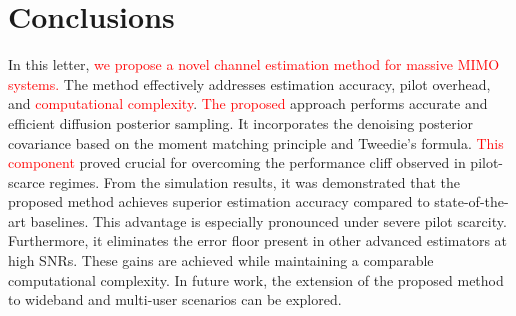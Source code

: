 \documentclass[lettersize,journal]{IEEEtran}
\newcommand{\tred}{\textcolor{red}}
\begin{document}
\section{Conclusions}

In this letter, \tred{we propose a novel channel estimation method for massive MIMO systems.} The method effectively addresses estimation accuracy, pilot overhead, and \tred{computational complexity}. \tred{The proposed} approach performs accurate and efficient diffusion posterior sampling. It incorporates the denoising posterior covariance based on the moment matching principle and Tweedie's formula. \tred{This component} proved crucial for overcoming the performance cliff observed in pilot-scarce regimes. From the simulation results, it was demonstrated that the proposed method achieves superior estimation accuracy compared to state-of-the-art baselines. This advantage is especially pronounced under severe pilot scarcity. Furthermore, it eliminates the error floor present in other advanced estimators at high SNRs. These gains are achieved while maintaining a comparable computational complexity. In future work, the extension of the proposed method to wideband and multi-user scenarios can be explored.

% 

\end{document}
